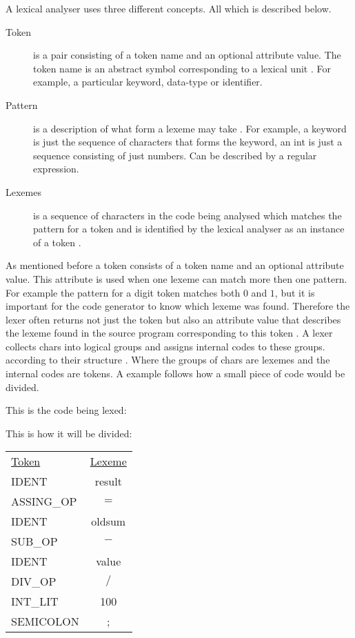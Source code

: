 A lexical analyser uses three different concepts. All which is described 
below. 
\begin{description}
  \item[Token]
    is a pair consisting of a token name and an optional attribute value. The 
token name is an abstract symbol corresponding to a lexical unit \cite{Aho2006}. 
For example, a particular keyword, data-type or identifier.
  \item[Pattern]
    is a description of what form a lexeme may take \cite{Aho2006}. 
For example, a keyword is just the sequence of characters that forms the 
keyword, an int is just a sequence consisting of just numbers. Can be described 
by a regular expression.
  \item[Lexemes]
    is a sequence of characters in the code being analysed which 
matches the pattern for a token and is identified by the lexical analyser as an 
instance of a token \cite{Aho2006}.
\end{description}
As mentioned before a token consists of a token name and an optional attribute value. 
This attribute is used when one lexeme can match more then one pattern. 
For example the pattern for a digit token matches both $0$ and $1$, 
but it is important for the code generator to know which lexeme was found. 
Therefore the lexer often returns not just the token but also an attribute value 
that describes the lexeme found in the source program corresponding to this 
token \cite{Aho2006}. A lexer collects chars into logical groups and assigns 
internal codes to these groups. according to their structure \cite{sebesta2012}. 
Where the groups of chars are lexemes and the internal codes are tokens. 
A example follows how a small piece of code would be divided.
\begin{example} \label{codeToToken}
This is the code being lexed:

This is how it will be divided:
\begin{center}
\begin{tabular}{l c}
\underline{Token} & \underline{Lexeme}\\
IDENT & result\\
ASSING\_OP & $=$\\
IDENT & oldsum\\
SUB\_OP & $-$\\
IDENT & value\\
DIV\_OP & $/$\\
INT\_LIT & 100\\
SEMICOLON & ;
\end{tabular}
\end{center}
\end{example}

